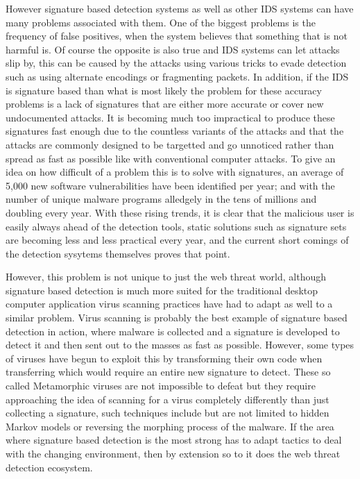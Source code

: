 However signature based detection systems as well as other IDS systems can have many problems associated with them.  One of the biggest problems is the frequency of false positives, when the system believes that something that is not harmful is.  Of course the opposite is also true and IDS systems can let attacks slip by, this can be caused by the attacks using various tricks to evade detection such as using alternate encodings or fragmenting packets. %
In addition, if the IDS is signature based than what is most likely the problem for these accuracy problems is a lack of signatures that are either more accurate or cover new undocumented attacks.  It is becoming much too impractical to produce these signatures fast enough due to the countless variants of the attacks and that the attacks are commonly designed to be targetted and go unnoticed rather than spread as fast as possible like with conventional computer attacks. %
To give an idea on how difficult of a problem this is to solve with signatures, an average of 5,000 new software vulnerabilities have been identified per year; and with the number of unique malware programs alledgely in the tens of millions and doubling every year.  With these rising trends, it is clear that the malicious user is easily always ahead of the detection tools, static solutions such as signature sets are becoming less and less practical every year, and the current short comings of the detection sysytems themselves proves that point.  %

However, this problem is not unique to just the web threat world, although signature based detection is much more suited for the traditional desktop computer application virus scanning practices have had to adapt as well to a similar problem.  Virus scanning is probably the best example of signature based detection in action, where malware is collected and a signature is developed to detect it and then sent out to the masses as fast as possible.  However, some types of viruses have begun to exploit this by transforming their own code when transferring which would require an entire new signature to detect.  These so called Metamorphic viruses are not impossible to defeat but they require approaching the idea of scanning for a virus completely differently than just collecting a signature, such techniques include but are not limited to hidden Markov models or reversing the morphing process of the malware. %
If the area where signature based detection is the most strong has to adapt tactics to deal with the changing environment, then by extension so to it does the web threat detection ecosystem.

